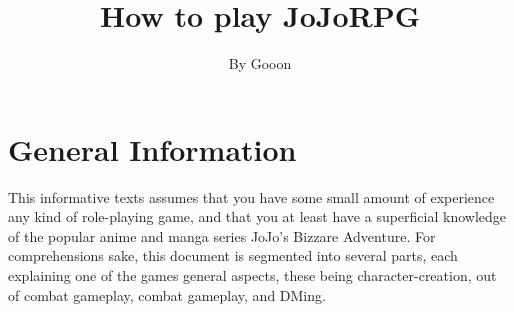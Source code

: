 \documentclass[a4paper,11pt]{article}
\begin{document}
\title{\Large{\textbf{How to play JoJoRPG}}}
\author{By Gooon}

\maketitle


\section{General Information}
This informative texts assumes that you have some small amount of experience any kind of role-playing game, and that you at least have a superficial knowledge of the popular anime and manga series JoJo's Bizzare Adventure. For comprehensions sake, this document is segmented into several parts, each explaining one of the games general aspects, these being character-creation, out of combat gameplay, combat gameplay, and DMing.
\end{document}
